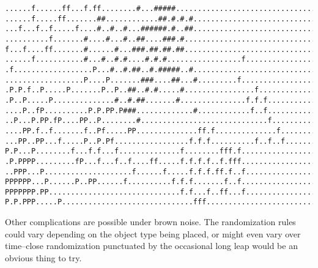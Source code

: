 \documentclass[12pt,a4paper]{article}
\begin{document}
\begin{verbatim}
......f......ff...f.ff........#...#####.................................
......f.....ff.......##............##.#.#.#.............................
...f...f..f.....f....#..#..#...######.#..##.............................
..........f.......#....#...#..##....###.#...............................
f...f....ff.......#......#...###.##.##.##...............................
......f...........#...#..#.#....#.#.#.................f.................
.f..................P...#..#.##..#.#####..#.............................
..................P....P.......###....##...#.........f..................
.P.P.f..P.....P.......P..P..##..#.#.....#................f..............
.P..P.....P..............#..#.##.......#...............f.f.f............
....P..fP..........P.P.PP.P###.............#............f..f............
..P...P.PP.fP....PP..P........#.............................f...........
....PP.f..f.......f..Pf.....PP..............ff.f..............f.........
...PP..PP...f.....P..P.Pf.................f.f.f..........f..f..f........
P.P...P........f...f.f...f..............f........fff.f..................
.P.PPPP.........fP...f...f..f....ff.....f.f.f.f..f.fff..................
..PPP...P....................f......f.....f.f.f.ff.f..f.................
PPPPPP...P......P..PP......f..........f.f.f.......f..f..................
PPPPPPP.PP..............................f.f...f..ff...f.................
P.P.PPP.....P..............................fff..........................
\end{verbatim}

Other complications are possible under brown noise. The
randomization rules could vary depending on the object type being
placed, or might even vary over time--close randomization punctuated
by the occasional long leap would be an obvious thing to try.
\end{document}
